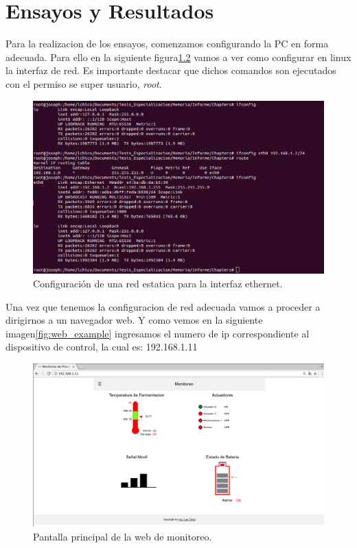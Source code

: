 
\chapter{Ensayos y Resultados} %

\label{Chapter4} %

Para la realizacion de los ensayos, comenzamos configurando la PC en forma adecuada. Para ello en la siguiente figura\ref{fig:hw_pc} vamos a ver como configurar en linux la interfaz de red. Es importante destacar que dichos comandos son ejecutados con el permiso se super usuario, \emph{root}.


\begin{figure}[h]
  \centering
  \includegraphics[scale=.35]{./Figures/config_net_console.png}
  \caption{Configuración de una red estatica para la interfaz ethernet.}
  \label{fig:hw_pc}
\end{figure}

Una vez que tenemos la configuracion de red adecuada vamos a proceder a dirigirnos a un navegador web. Y como vemos en la siguiente imagen\ref{fig:web_example} ingresamos el numero de ip correspondiente al dispositivo de control, la cual es: 192.168.1.11 

\begin{figure}[h]
  \centering
  \includegraphics[scale=.25]{./Figures/web_example.png}
  \caption{Pantalla principal de la web de monitoreo.}
  \label{fig:hw_pc}
\end{figure}

